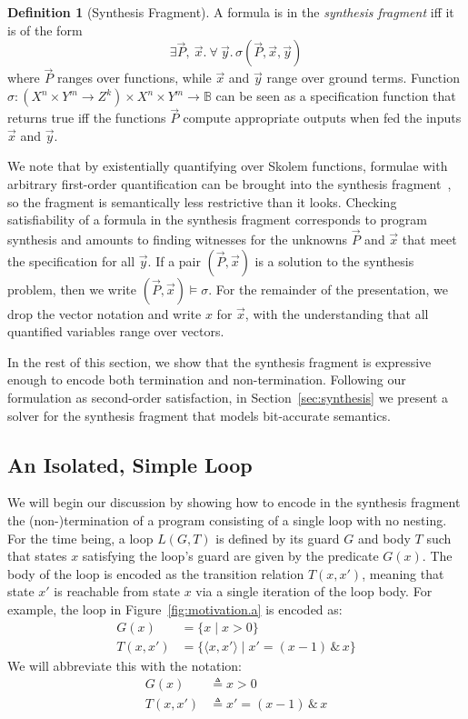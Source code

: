 \documentclass[preprint]{sigplanconf}
\theoremstyle{definition}
\newtheorem{definition}[theorem]{Definition}
\begin{document}
\begin{definition}[Synthesis Fragment]
A formula is in the \emph{synthesis fragment} iff it is of the form
%
 \[
  \exists \vec{P},~ \vec{x} . ~\forall~ \vec{y} .\, \sigma(\vec{P}, \vec{x}, \vec{y})
 \]
%
where $\vec{P}$ ranges over functions, while $\vec{x}$ and $\vec{y}$ range over
ground terms.  Function $\sigma: (X^n \times Y^m \to Z^k) \times X^n \times
Y^m \to \mathbb{B}$ can be seen as a specification function that returns
true iff the functions $\vec{P}$ compute appropriate outputs when fed the
inputs $\vec{x}$ and $\vec{y}$.
%
\end{definition}
%
We note that by existentially quantifying over Skolem functions, formulae with arbitrary
first-order quantification can be brought into the synthesis fragment~\cite{hol-book}, so the
fragment is semantically less restrictive than it looks.
Checking satisfiability of a formula in the synthesis fragment corresponds to program synthesis and
amounts to finding witnesses for the unknowns $\vec{P}$ and $\vec{x}$ that meet the specification
for all $\vec{y}$. 
If a pair $(\vec{P}, \vec{x})$ is a solution to the synthesis problem, then we write $(\vec{P}, \vec{x}) \models \sigma$.
For the remainder of the presentation, we drop the vector notation and write $x$ for $\vec{x}$, with the understanding
that all quantified variables range over vectors.

In the rest of this section, we show that the synthesis fragment 
is expressive enough to encode both termination and non-termination. 
Following our formulation as second-order satisfaction, 
in Section~\ref{sec:synthesis} we present a solver for the synthesis fragment that models bit-accurate semantics. 



\subsection{An Isolated, Simple Loop}

We will begin our discussion by showing how to encode in the synthesis fragment the
\mbox{(non-)termination} of a program consisting of a single loop with no nesting.
For the time being, a loop $L(G, T)$ is defined by its guard $G$ and body $T$
such that states $x$ satisfying the loop's guard are given by the
predicate $G(x)$.  The body of the loop is encoded as the transition
relation $T(x, x')$, meaning that state $x'$ is reachable from state $x$ via
a single iteration of the loop body.  For example, the loop in
Figure~\ref{fig:motivation.a} is encoded as:
%
\begin{align*}
G(x) & = \{ x \mid x>0 \} \\
T(x,x') &= \{ \langle x, x' \rangle \mid x' = (x - 1) \, \& \, x \}
\end{align*}
We will abbreviate this with the notation:
\begin{align*}
G(x) & \triangleq x > 0 \\
T(x, x') & \triangleq x' = (x - 1) \, \& \, x
\end{align*}
\end{document}
